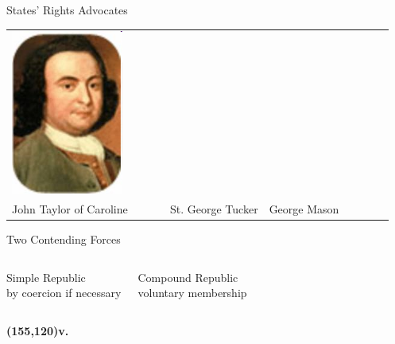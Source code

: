 \begin{frame}{States' Rights Advocates}
\begin{table}[h]
\begin{tabular}{lcccccc}
    \includegraphics[width=0.75\textwidth,height=.3\textheight,keepaspectratio=true]{img/george-mason.png} \\
    John Taylor of Caroline &
    St. George Tucker &
    George Mason \\
\end{tabular}
\end{table}
\end{frame}

\begin{frame}{Two Contending Forces}
    \begin{columns}[onlytextwidth]
            \begin{varblock}[0.93\textwidth]{}\centering \huge{Simple Republic} \\ \vspace{20pt} by coercion if necessary\end{varblock}

            \begin{varblock}[0.93\textwidth]{}\centering \huge{Compound Republic} \\ \vspace{20pt} voluntary membership\end{varblock}
    \end{columns}
    \textbf{\huge{ \color{red}
        \Put(155,120){v.}
    }}
\end{frame}

